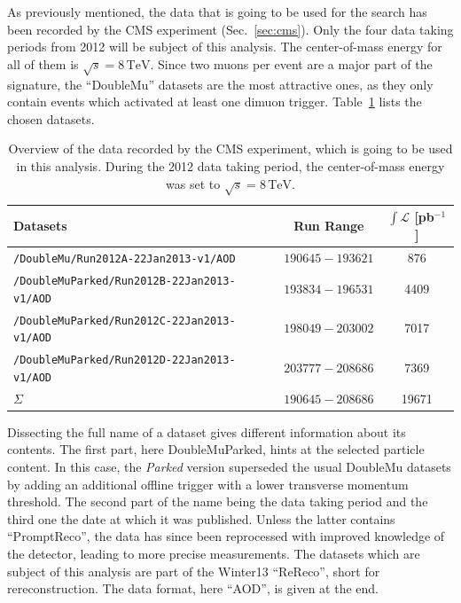 As previously mentioned, the data that is going to be used for the search has been recorded by the CMS experiment (Sec.~\ref{sec:cms}). Only the four data taking periods from 2012 will be subject of this analysis. The center-of-mass energy for all of them is $\sqrt{s} = 8\,\text{TeV}$. Since two muons per event are a major part of the signature, the ``DoubleMu'' datasets are the most attractive ones, as they only contain events which activated at least one dimuon trigger. Table~\ref{tab:data} lists the chosen datasets.

\begin{table}[h!]
  \centering
  \begin{tabular}{|l|c|c|}
    \hline
    Datasets                                         & Run Range         & $\int \mathcal{L}$ [pb$^{-1}$] \\ \hline \hline
    \verb+/DoubleMu/Run2012A-22Jan2013-v1/AOD+       & $190645 - 193621$ & 876                            \\ \hline
    \verb+/DoubleMuParked/Run2012B-22Jan2013-v1/AOD+ & $193834 - 196531$ & 4409                           \\ \hline
    \verb+/DoubleMuParked/Run2012C-22Jan2013-v1/AOD+ & $198049 - 203002$ & 7017                           \\ \hline
    \verb+/DoubleMuParked/Run2012D-22Jan2013-v1/AOD+ & $203777 - 208686$ & 7369                           \\ \hline
    $\Sigma$                                         & $190645 - 208686$ & 19671                          \\ \hline
  \end{tabular}
  \caption{Overview of the data recorded by the CMS experiment, which is going to be used in this analysis. During the 2012 data taking period, the center-of-mass energy was set to $\sqrt{s} = 8\,\text{TeV}$.}
  \label{tab:data}
\end{table}

Dissecting the full name of a dataset gives different information about its contents. The first part, here DoubleMuParked, hints at the selected particle content. In this case, the \textit{Parked} version superseded the usual DoubleMu datasets by adding an additional offline trigger with a lower transverse momentum threshold. The second part of the name being the data taking period and the third one the date at which it was published. Unless the latter contains ``PromptReco'', the data has since been reprocessed with improved knowledge of the detector, leading to more precise measurements. The datasets which are subject of this analysis are part of the Winter13 ``ReReco'', short for rereconstruction. The data format, here ``AOD'', is given at the end.

